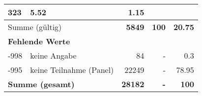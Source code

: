 \begin{longtable}{lXrrr}
       \num{323} &
       \num[round-mode=places,round-precision=2]{5.52} &
         \num[round-mode=places,round-precision=2]{1.15} \\
     \midrule
     \multicolumn{2}{l}{Summe (gültig)} &
       \textbf{\num{5849}} &
     \textbf{\num{100}} &
       \textbf{\num[round-mode=places,round-precision=2]{20.75}} \\
     \multicolumn{5}{l}{\textbf{Fehlende Werte}}\\
       -998 &
       keine Angabe &
         \num{84} &
        - &
         \num[round-mode=places,round-precision=2]{0.3} \\
       -995 &
       keine Teilnahme (Panel) &
         \num{22249} &
        - &
         \num[round-mode=places,round-precision=2]{78.95} \\
     \midrule
     \multicolumn{2}{l}{\textbf{Summe (gesamt)}} &
          \textbf{\num{28182}} &
        \textbf{-} &
        \textbf{\num{100}} \\
     \bottomrule
     \end{longtable}
     
